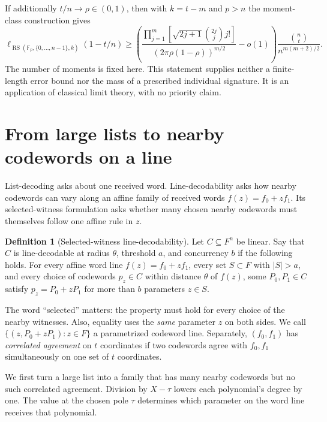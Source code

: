 \documentclass[11pt,letterpaper]{article}
\theoremstyle{definition}
\newtheorem{definition}[theorem]{Definition}
\theoremstyle{remark}
\begin{document}
If additionally $t/n\to\rho\in(0,1)$, then with $k=t-m$ and $p>n$
the moment-class construction gives
\[
 \ell_{\operatorname{RS}(\mathbb F_p,\{0,\ldots,n-1\},k)}(1-t/n)
 \ge\left(
 \frac{\prod_{j=1}^m[\sqrt{2j+1}\binom{2j}{j}j!]}
 {(2\pi\rho(1-\rho))^{m/2}}-o(1)\right)
 \frac{\binom nt}{n^{m(m+2)/2}}.
\]
The number of moments is fixed here. This statement supplies neither
a finite-length error bound nor the mass of a prescribed individual
signature. It is an application of classical limit theory, with no
priority claim.

\section{From large lists to nearby codewords on a line}
\label{sec:lines}

List-decoding asks about one received word. Line-decodability asks how
nearby codewords can vary along an affine family of received words
$f(z)=f_0+zf_1$. Its selected-witness formulation asks whether many chosen
nearby codewords must themselves follow one affine rule in $z$.

\begin{definition}[Selected-witness line-decodability]
Let $C\subseteq F^n$ be linear. Say that $C$ is line-decodable at radius
$\theta$, threshold $a$, and concurrency $b$ if the following holds.
For every affine word line $f(z)=f_0+zf_1$, every set $S\subset F$ with
$|S|>a$, and every choice of codewords $p_z\in C$ within distance $\theta$
of $f(z)$, some $P_0,P_1\in C$ satisfy $p_z=P_0+zP_1$ for more than
$b$ parameters $z\in S$.
\end{definition}

The word ``selected'' matters: the property must hold for every choice of
the nearby witnesses. Also, equality uses the \emph{same} parameter $z$
on both sides. We call $\{(z,P_0+zP_1):z\in F\}$ a parametrized codeword
line. Separately, $(f_0,f_1)$ has \emph{correlated agreement} on $t$
coordinates if two codewords agree with $f_0,f_1$ simultaneously on one
set of $t$ coordinates.

We first turn a large list into a family that has many nearby codewords
but no such correlated agreement. Division by $X-\tau$ lowers each
polynomial's degree by one. The value at the chosen pole $\tau$ determines
which parameter on the word line receives that polynomial.
\end{document}
